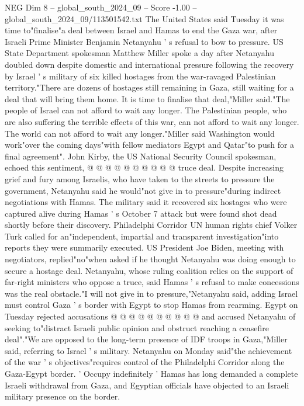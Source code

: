 \begin{textsample}{NEG Dim 8 – global\_south\_2024\_09 – Score -1.00 – global\_south\_2024\_09/113501542.txt}  \label{ex:f8_neg_204}
The United States said Tuesday it was time to"finalise"a deal between Israel and Hamas to end the Gaza war, after Israeli Prime Minister Benjamin Netanyahu ' s refusal to bow to pressure.
US State Department spokesman Matthew Miller spoke a day after Netanyahu doubled down despite domestic and international pressure following the recovery by Israel ' s military of six killed hostages from the war-ravaged Palestinian territory."There are dozens of hostages still remaining in Gaza, still waiting for a deal that will bring them home.
It is time to finalise that deal,"Miller said."The people of Israel can not afford to wait any longer.
The Palestinian people, who are also suffering the terrible effects of this war, can not afford to wait any longer.
The world can not afford to wait any longer."Miller said Washington would work"over the coming days"with fellow mediators Egypt and Qatar"to push for a final agreement".
John Kirby, the US National Security Council spokesman, echoed this sentiment, @ @ @ @ @ @ @ @ @ @ truce deal.
Despite increasing grief and fury among Israelis, who have taken to the streets to pressure the government, Netanyahu said he would"not give in to pressure"during indirect negotiations with Hamas.
The military said it recovered six hostages who were captured alive during Hamas ' s October 7 attack but were found shot dead shortly before their discovery.
Philadelphi Corridor UN human rights chief Volker Turk called for an"independent, impartial and transparent investigation"into reports they were summarily executed.
US President Joe Biden, meeting with negotiators, replied"no"when asked if he thought Netanyahu was doing enough to secure a hostage deal.
Netanyahu, whose ruling coalition relies on the support of far-right ministers who oppose a truce, said Hamas ' s refusal to make concessions was the real obstacle."I will not give in to pressure,"Netanyahu said, adding Israel must control Gaza ' s border with Egypt to stop Hamas from rearming.
Egypt on Tuesday rejected accusations @ @ @ @ @ @ @ @ @ @ and accused Netanyahu of seeking to"distract Israeli public opinion and obstruct reaching a ceasefire deal"."We are opposed to the long-term presence of IDF troops in Gaza,"Miller said, referring to Israel ' s military.
Netanyahu on Monday said"the achievement of the war ' s objectives"requires control of the Philadelphi Corridor along the Gaza-Egypt border. ' Occupy indefinitely ' Hamas has long demanded a complete Israeli withdrawal from Gaza, and Egyptian officials have objected to an Israeli military presence on the border.

\end{textsample}
